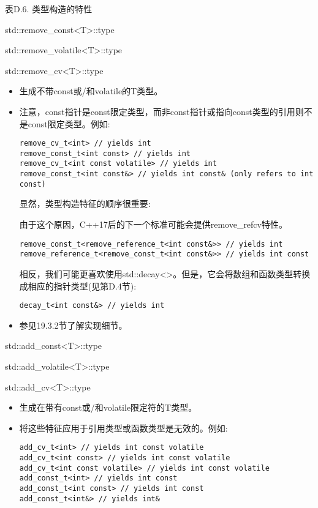 \begin{center}
表D.6. 类型构造的特性
\end{center}

std::remove\_const<T>::type

std::remove\_volatile<T>::type

std::remove\_cv<T>::type

\begin{itemize}
\item
生成不带const或/和volatile的T类型。

\item
注意，const指针是const限定类型，而非const指针或指向const类型的引用则不是const限定类型。例如:

\begin{lstlisting}[style=styleCXX]
remove_cv_t<int> // yields int
remove_const_t<int const> // yields int
remove_cv_t<int const volatile> // yields int
remove_const_t<int const&> // yields int const& (only refers to int const)
\end{lstlisting}

显然，类型构造特征的顺序很重要:

\begin{tcolorbox}[colback=webgreen!5!white,colframe=webgreen!75!black]
\hspace*{0.75cm}由于这个原因，C++17后的下一个标准可能会提供remove\_refcv特性。
\end{tcolorbox}

\begin{lstlisting}[style=styleCXX]
remove_const_t<remove_reference_t<int const&>> // yields int
remove_reference_t<remove_const_t<int const&>> // yields int const
\end{lstlisting}

相反，我们可能更喜欢使用std::decay<>。但是，它会将数组和函数类型转换成相应的指针类型(见第D.4节):

\begin{lstlisting}[style=styleCXX]
decay_t<int const&> // yields int
\end{lstlisting}

\item
参见19.3.2节了解实现细节。
\end{itemize}

std::add\_const<T>::type

std::add\_volatile<T>::type

std::add\_cv<T>::type

\begin{itemize}
\item
生成在带有const或/和volatile限定符的T类型。

\item
将这些特征应用于引用类型或函数类型是无效的。例如:
\begin{lstlisting}[style=styleCXX]
add_cv_t<int> // yields int const volatile
add_cv_t<int const> // yields int const volatile
add_cv_t<int const volatile> // yields int const volatile
add_const_t<int> // yields int const
add_const_t<int const> // yields int const
add_const_t<int&> // yields int&
\end{lstlisting}
\end{itemize}

